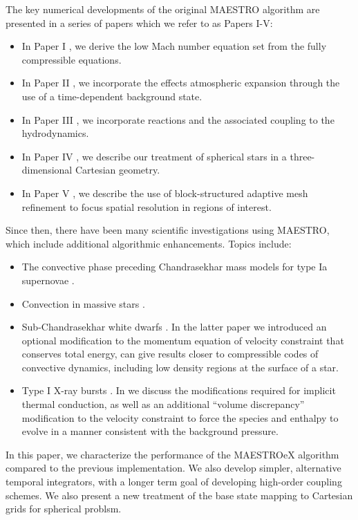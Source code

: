 \documentclass{aastex62}
\begin{document}
The key numerical developments of the original MAESTRO algorithm are presented in a series of papers which we refer to as Papers I-V:
\begin{itemize}
\item In Paper I \citep{MAESTRO_I}, we derive the low Mach number equation set from the fully compressible equations.
\item In Paper II \citep{MAESTRO_II}, we incorporate the effects atmospheric expansion through the use of a time-dependent background state.
\item In Paper III \citep{MAESTRO_III}, we incorporate reactions and the associated coupling to the hydrodynamics.
\item In Paper IV \citep{MAESTRO_IV}, we describe our treatment of spherical stars in a three-dimensional Cartesian geometry.
\item In Paper V \citep{MAESTRO_V}, we describe the use of block-structured adaptive mesh refinement to focus spatial resolution in regions of interest.
\end{itemize} 

Since then, there have been many scientific investigations using MAESTRO, which include additional algorithmic enhancements.  Topics include:
\begin{itemize}
\item The convective phase preceding Chandrasekhar mass models for type Ia supernovae \citep{MAESTRO_convection,MAESTRO_AMR,MAESTRO_CASTRO}.
\item Convection in massive stars \citep{Gilet:2013}.
\item Sub-Chandrasekhar white dwarfs \citep{subChandra_I,subChandra_II}.  In the latter paper we introduced an optional modification to the momentum equation of velocity constraint that conserves total energy, can give results closer to compressible codes of convective dynamics, including low density regions at the surface of a star.
\item Type I X-ray bursts \citep{XRB_I,XRB_II,XRB_III}.  In \cite{XRB_I} we discuss the modifications required for implicit thermal conduction, as well as an additional ``volume discrepancy'' modification to the velocity constraint to force the species and enthalpy to evolve in a manner consistent with the background pressure.
\end{itemize}

In this paper, we characterize the performance of the MAESTROeX algorithm compared to the previous implementation.
We also develop simpler, alternative temporal integrators, with a longer term goal of developing high-order coupling schemes.
We also present a new treatment of the base state mapping to Cartesian grids for spherical problsm.
\end{document}
